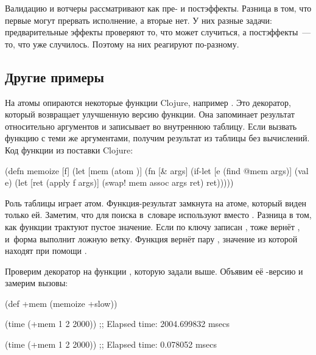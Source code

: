 \fi

Валидацию и вотчеры рассматривают как пре- и постэффекты. Разница в том, что
первые могут прервать исполнение, а вторые нет. У них разные задачи:
предварительные эффекты проверяют то, что может случиться, а постэффекты~--- то,
что уже случилось. Поэтому на них реагируют по-разному.

\subsection{Другие примеры}


На атомы опираются некоторые функции Clojure, например . Это
декоратор, который возвращает улучшенную версию функции. Она запоминает
результат относительно аргументов и записывает во внутреннюю таблицу. Если
вызвать функцию с теми же аргументами, получим результат из таблицы без
вычислений. Код функции  из поставки Clojure:


\begin{clojure}
(defn memoize [f]
  (let [mem (atom {})]
    (fn [& args]
      (if-let [e (find @mem args)]
        (val e)
        (let [ret (apply f args)]
          (swap! mem assoc args ret)
          ret)))))
\end{clojure}

Роль таблицы играет атом. Функция-ре\-зуль\-тат  замкнута на
атоме, который виден только ей. Заметим, что для поиска в~словаре используют
 вместо . Разница в том, как функции трактуют пустое
значение. Если по ключу записан ,  тоже вернёт ,
и~форма  выполнит ложную ветку. Функция  вернёт пару
, значение из которой находят при помощи .

Проверим декоратор на функции , которую задали выше. Объявим её
-версию и замерим вызовы:

\begin{clojure}
(def +mem (memoize +slow))

(time (+mem 1 2 2000))
;; Elapsed time: 2004.699832 msecs

(time (+mem 1 2 2000))
;; Elapsed time: 0.078052 msecs
\end{clojure}


